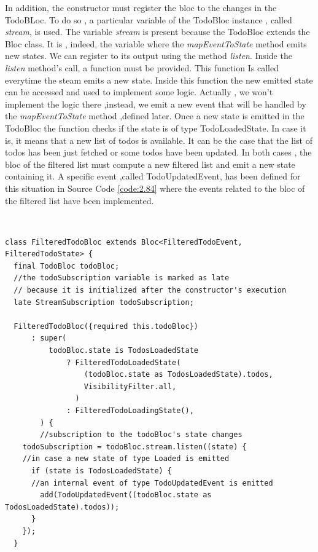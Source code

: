 In addition, the constructor must register the bloc to the changes in the TodoBLoc. To do so , a particular variable of the TodoBloc instance , called \textit{stream}, is used. The variable \textit{stream} is present because the TodoBloc extends the Bloc class. It is , indeed, the variable where the \textit{mapEventToState} method emits new states. We can register to its output using the method \textit{listen}. Inside the \textit{listen} method’s call, a function must be provided. This function Is called everytime the steam emits a new state. Inside this function the new emitted state can be accessed and used to implement some logic. Actually , we won’t implement the logic there ,instead, we emit a new event that will be handled by the \textit{mapEventToState} method ,defined later. Once a new state is emitted in the TodoBloc the function checks if the state is of type TodoLoadedState. In case it is, it means that a new list of todos is available. It can be the case that the list of todos has been just fetched or some todos have been updated. In both cases , the bloc of the filtered list must compute a new filtered list and emit a new state containing it. A specific event ,called TodoUpdatedEvent, has been defined for this situation in Source Code \ref{code:2.84} where the events related to the bloc of the filtered list have been implemented.
\begin{code}
\mbox{}\\
 \mbox{}
\label{code:2.14}
\begin{verbatim}
class FilteredTodoBloc extends Bloc<FilteredTodoEvent, FilteredTodoState> {
  final TodoBloc todoBloc;
  //the todoSubscription variable is marked as late
  // because it is initialized after the constructor's execution
  late StreamSubscription todoSubscription;

  FilteredTodoBloc({required this.todoBloc})
      : super(
          todoBloc.state is TodosLoadedState
              ? FilteredTodoLoadedState(
                  (todoBloc.state as TodosLoadedState).todos,
                  VisibilityFilter.all,
                )
              : FilteredTodoLoadingState(),
        ) {
        //subscription to the todoBloc's state changes
    todoSubscription = todoBloc.stream.listen((state) {
    //in case a new state of type Loaded is emitted
      if (state is TodosLoadedState) {
      //an internal event of type TodoUpdatedEvent is emitted
        add(TodoUpdatedEvent((todoBloc.state as TodosLoadedState).todos));
      }
    });
  }
\end{verbatim}
\mbox{}
\end{code}

